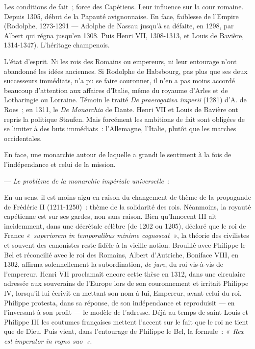 \documentclass[french,twoside]{book} %
\def\mednobreak{\ifdim\lastskip<\medskipamount
  \removelastskip\nopagebreak\medskip\fi}
\newcommand{\labelblock}[1]{\medbreak{\noindent\color{rubric}\bfseries #1}\par\mednobreak}
\begin{document}
\labelblock{— {\itshape Deuxième période} : l’expansion française dans l’Empire.}

\noindent Les conditions de fait ; force des Capétiens. Leur influence sur la cour romaine. Depuis 1305, début de la Papauté avignonnaise.  
\label{p32} En face, faiblesse de l’Empire (Rodolphe, 1273-1291 — Adolphe de Nassau jusqu’à sa défaite, en 1298, par Albert qui régna jusqu’en 1308. Puis Henri VII, 1308-1313, et Louis de Bavière, 1314-1347). L’héritage champenois.\par
L’état d’esprit. Ni les rois des Romains ou empereurs, ni leur entourage n’ont abandonné les idées anciennes. Si Rodolphe de Habsbourg, pas plus que ses deux successeurs immédiats, n’a pu se faire couronner, il n’en a pas moins accordé beaucoup d’attention aux affaires d’Italie, même du royaume d’Arles et de Lotharingie ou Lorraine. Témoin le traité {\itshape De praerogativa imperii} (1281) d’A. de Roes ; en 1311, le {\itshape De Monarchia} de Dante. Henri VII et Louis de Bavière ont repris la politique Staufen. Mais forcément les ambitions de fait sont obligées de se limiter à des buts immédiats : l’Allemagne, l’Italie, plutôt que les marches occidentales.\par
En face, une monarchie autour de laquelle a grandi le sentiment à la fois de l’indépendance et celui de la mission.\par
— {\itshape Le problème de la monarchie impériale universelle} :\par
En un sens, il est moins aigu en raison du changement de thème de la propagande de Frédéric II (1211-1250) : thème de la solidarité des rois. Néanmoins, la royauté capétienne est sur ses gardes, non sans raison. Bien qu’Innocent III ait incidemment, dans une décrétale célèbre (de 1202 ou 1205), déclaré que le roi de France \emph{« superiorem in temporalibus minime cognoscat »}, la théorie des civilistes et souvent des canonistes reste fidèle à la vieille notion. Brouillé avec Philippe le Bel et réconcilié avec le roi des Romains, Albert d’Autriche, Boniface VIII, en 1302, affirma solennellement la subordination, {\itshape de jure}, du roi vis-à-vis de l’empereur. Henri VII proclamait encore cette thèse en 1312, dans une circulaire adressée aux souverains de l’Europe lors de son couronnement et irritait Philippe IV, lorsqu’il lui écrivit en mettant son nom à lui, Empereur, avant celui du roi. Philippe protesta, dans sa réponse, de son indépendance et reproduisit — en l’inversant à son profit — le modèle de l’adresse. Déjà au temps de saint Louis et Philippe III les coutumes françaises mettent l’accent sur le fait que le roi ne tient que de Dieu. Puis vient, dans l’entourage de Philippe le Bel, la formule : \emph{« Rex est imperator in regno suo »}.\par
\end{document}
